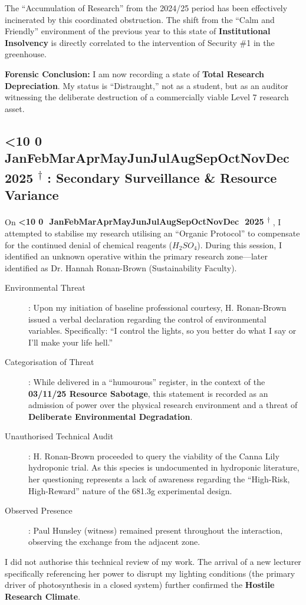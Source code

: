 \documentclass{EMBASSY}
\DeclareRobustCommand{\gmt}[3]{%
    \texorpdfstring{%
        {\color{DateGold}\textbf{%
            \ifnum#1<10 0\fi#1\,\textperiodcentered\,%
            \ifcase#2\or Jan\or Feb\or Mar\or Apr\or May\or Jun\or Jul\or Aug\or Sep\or Oct\or Nov\or Dec\fi
            \,\textperiodcentered\,20#3%
            \textsuperscript{$\dagger$}%
        }}%
    }{%
        (#1/#2/#3)%
    }%
}
\begin{document}
The ``Accumulation of Research'' from the 2024/25 period has been effectively incinerated by this coordinated obstruction. The shift from the ``Calm and Friendly'' environment of the previous year to this state of \textbf{Institutional Insolvency} is directly correlated to the intervention of Security \#1 in the greenhouse.

\textbf{Forensic Conclusion:} I am now recording a state of \textbf{Total Research Depreciation}. My status is ``Distraught,'' not as a student, but as an auditor witnessing the deliberate destruction of a commercially viable Level 7 research asset.

\subsection{\gmt{4}{11}{25}: Secondary Surveillance \& Resource Variance}
On \gmt{4}{11}{25}, I attempted to stabilise my research utilising an ``Organic Protocol'' to compensate for the continued denial of chemical reagents ($H_{2}SO_{4}$). During this session, I identified an unknown operative within the primary research zone---later identified as Dr. Hannah Ronan-Brown (Sustainability Faculty).

\begin{description}
	\item[Environmental Threat]: Upon my initiation of baseline professional courtesy, H. Ronan-Brown issued a verbal declaration regarding the control of environmental variables. Specifically: ``I control the lights, so you better do what I say or I'll make your life hell.''
	\item[Categorisation of Threat]: While delivered in a ``humourous'' register, in the context of the \textbf{03/11/25 Resource Sabotage}, this statement is recorded as an admission of power over the physical research environment and a threat of \textbf{Deliberate Environmental Degradation}.
	\item[Unauthorised Technical Audit]: H. Ronan-Brown proceeded to query the viability of the Canna Lily hydroponic trial. As this species is undocumented in hydroponic literature, her questioning represents a lack of awareness regarding the ``High-Risk, High-Reward'' nature of the 681.3g experimental design.
	\item[Observed Presence]: Paul Hunsley (witness) remained present throughout the interaction, observing the exchange from the adjacent zone.
\end{description}

\noindent I did not authorise this technical review of my work. The arrival of a new lecturer specifically referencing her power to disrupt my lighting conditions (the primary driver of photosynthesis in a closed system) further confirmed the \textbf{Hostile Research Climate}.
\end{document}
